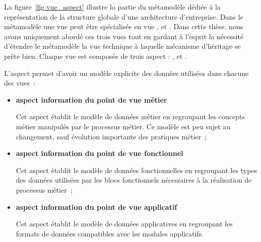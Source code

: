     La figure~\ref{fig:vue_aspect} illustre la partie du métamodèle dédiée à la représentation de la structure globale d'une architecture
    d'entreprise. Dans le métamodèle une vue peut être spécialisée en vue ,  et . 
    Dans cette thèse, nous avons
    uniquement abordé ces trois vues tout en gardant à l'esprit la nécessité d'étendre le métamodèle la vue technique à laquelle mécanisme
    d'héritage se prête bien. Chaque vue est composée de trois aspect : ,  et . 

L'aspect  permet d'avoir un
modèle explicite des données utilisées dans chacune des vues~:

\begin{itemize} 

\item \textbf{aspect information du point de vue métier}

Cet aspect établit le modèle de données métier en regroupant les
concepts métier manipulés par le processus métier. Ce modèle est peu sujet au
changement, sauf évolution importante des pratiques métier~;

\item \textbf{aspect information du point de vue fonctionnel}

Cet aspect établit le modèle de données fonctionnelles en regroupant les types des
données utilisées par les blocs fonctionnels nécessaires à la réalisation de
processus métier~;

\item \textbf{aspect information du point de vue applicatif}

Cet aspect établit le modèle de données applicatives en regroupant les formats de données
compatibles avec les modules applicatifs.

\end{itemize}

